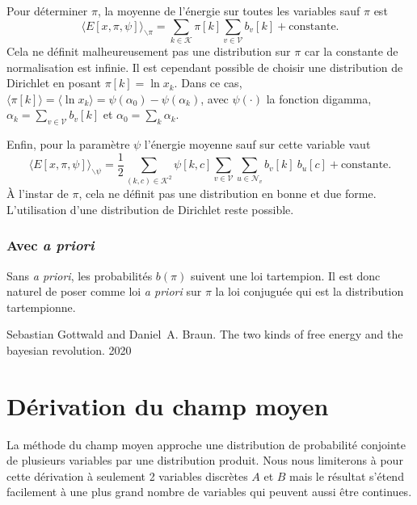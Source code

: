 \documentclass[a4paper,11pt,oneside]{article}
\let\<\langle
\let\>\rangle
\begin{document}
Pour déterminer $\pi$, la moyenne de l’énergie sur toutes
les variables sauf $\pi$ est
\begin{equation}
  \label{eq:24}
  \bigr\<E[x,\pi,\psi]\bigr\>_{\backslash\pi}
  = \sum_{k\in\mathcal K} \pi[k] \sum_{v\in\mathcal V}
  b_v[k] + \text{constante}.
\end{equation}
Cela ne définit malheureusement pas une distribution sur
$\pi$ car la constante de normalisation est infinie. Il est
cependant possible de choisir une distribution de Dirichlet
en posant $\pi[k] = \ln x_k$. Dans ce cas, $\<\pi[k]\> =
\<\ln x_k\> = \psi(\alpha_0) - \psi(\alpha_k)$, avec
$\psi(\cdot)$ la fonction digamma, $\alpha_k =
\sum_{v\in\mathcal V} b_v[k]$ et $\alpha_0 = \sum_k
\alpha_k$.

Enfin, pour la paramètre $\psi$ l'énergie moyenne sauf sur
cette variable vaut
\begin{equation}
  \label{eq:25}
  \bigr\<E[x,\pi,\psi]\bigr\>_{\backslash\psi}
  = \frac12 \sum_{(k,c)\in\mathcal K^2} \psi[k, c]
  \sum_{v\in\mathcal V}
  \sum_{u\in\mathcal N_v}
  b_v[k]\:b_u[c] + \text{constante}.
\end{equation}
À l'instar de $\pi$, cela ne définit pas une distribution en
bonne et due forme. L'utilisation d'une distribution de
Dirichlet reste possible.


\subsubsection{Avec \emph{a priori}}
\label{sec:avec-a-priori}


Sans \emph{a priori}, les probabilités $b(\pi)$ suivent une
loi tartempion. Il est donc naturel de poser comme loi
\emph{a priori} sur $\pi$ la loi conjuguée qui est la
distribution tartempionne.


% 
% 
\begin{thebibliography}{GB}
 Sebastian Gottwald and Daniel~A. Braun.
  \newblock The two kinds of free energy and the bayesian
  revolution. 2020
\end{thebibliography}

\appendix
\section{Dérivation du champ moyen}
\label{sec:derivation-du-champ}

La méthode du champ moyen approche une distribution de
probabilité conjointe de plusieurs variables par une
distribution produit. Nous nous limiterons à pour cette
dérivation à seulement 2 variables discrètes $A$ et $B$ mais
le résultat s'étend facilement à une plus grand nombre de
variables qui peuvent aussi être continues.
\end{document}
